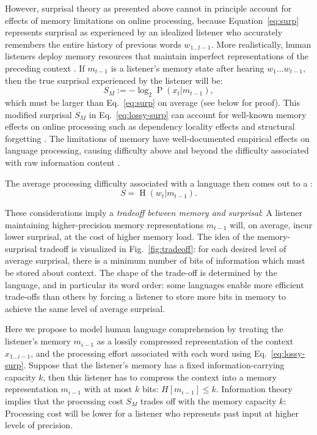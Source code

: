 However, surprisal theory as presented above cannot in principle account for effects of memory limitations on online processing, because Equation~\ref{eq:surp} represents surprisal as experienced by an idealized listener who accurately remembers the entire history of previous words $w_{1...t-1}$.
More realistically, human listeners deploy memory resources that maintain imperfect representations of the preceding context \citep{lewis-activation-based-2005, futrell-noisy-context-2017}.
If $m_{t-1}$ is a listener's memory state after hearing $w_1\dots w_{t-1}$, then the true surprisal experienced by the listener will be:
\begin{equation}
  \label{eq:lossy-surp}
  S_M := -\log_2 \operatorname{P}(x_t|m_{t-1}),
\end{equation}
which must be larger than Eq.~\ref{eq:surp} on average (see below for proof).
This modified surprisal $S_M$ in Eq.~\ref{eq:lossy-surp} can account for well-known memory effects on online processing such as dependency locality effects and structural forgetting \citep{futrell-noisy-context-2017,futrell2019information}.
The limitations of memory have well-documented empirical effects on language processing, causing difficulty above and beyond the difficulty associated with raw information content \cite{gibson1998linguistic,gibson1999memory,gibson2000dependency,vasishth2005activationbased,levy2013memory}.

The average processing difficulty associated with a language then comes out to a :
\begin{equation}
	S = \operatorname{H}(w_t|m_{t-1}).
\end{equation}


These considerations imply a \emph{tradeoff between memory and surprisal}:
A listener maintaining higher-precision memory representations $m_{t-1}$ will, on average, incur lower surprisal, at the cost of higher memory load.
The idea of the memory-surprisal tradeoff is visualized in Fig.~\ref{fig:tradeoff}: for each desired level of average surprisal, there is a minimum number of bits of information which must be stored about context.
The shape of the trade-off is determined by the language, and in particular its word order:
some languages enable more efficient trade-offs than others by forcing a listener to store more bits in memory to achieve the same level of average surprisal.


Here we propose to model human language comprehension by treating the listener's memory $m_{i-1}$ as a lossily compressed representation of the context $x_{1...i-1}$, and the processing effort associated with each word using Eq.~\ref{eq:lossy-surp}.
Suppose that the listener's memory has a fixed information-carrying capacity $k$, then this listener has to compress the context into a memory representation $m_{i-1}$ with at most $k$ bits: $H[m_{i-1}] \leq k$.
Information theory implies that the processing cost $S_M$ trades off with the memory capacity $k$:
Processing cost will be lower for a listener who represents past input at higher levels of precision.




